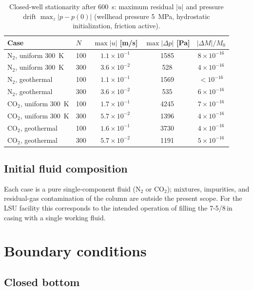 \documentclass[11pt]{article}
\newcommand{\co}{CO$_2$}
\begin{document}
\begin{table}[htb]
\centering
\caption{Closed-well stationarity after \SI{600}{s}: maximum residual
$|u|$ and pressure drift $\max_z|p - p(0)|$ (wellhead pressure
\SI{5}{MPa}, hydrostatic initialization, friction active).}
\label{tab:static}
\begin{tabular}{llccc}
\toprule
Case & $N$ & $\max|u|$ [m/s] & $\max|\Delta p|$ [Pa] &
$|\Delta M|/M_0$\\
\midrule
N$_2$, uniform \SI{300}{K} & 100 & $1.1\times10^{-1}$ & 1585 & $8\times10^{-16}$\\
N$_2$, uniform \SI{300}{K} & 300 & $3.6\times10^{-2}$ & 528 & $4\times10^{-16}$\\
N$_2$, geothermal          & 100 & $1.1\times10^{-1}$ & 1569 & $<10^{-16}$\\
N$_2$, geothermal          & 300 & $3.6\times10^{-2}$ & 535 & $6\times10^{-16}$\\
\co, uniform \SI{300}{K}   & 100 & $1.7\times10^{-1}$ & 4245 & $7\times10^{-16}$\\
\co, uniform \SI{300}{K}   & 300 & $5.7\times10^{-2}$ & 1396 & $4\times10^{-16}$\\
\co, geothermal            & 100 & $1.6\times10^{-1}$ & 3730 & $4\times10^{-16}$\\
\co, geothermal            & 300 & $5.7\times10^{-2}$ & 1191 & $5\times10^{-16}$\\
\bottomrule
\end{tabular}
\end{table}

\subsection{Initial fluid composition}

Each case is a pure single-component fluid (N$_2$ or \co); mixtures,
impurities, and residual-gas contamination of the column are outside
the present scope. For the LSU facility this corresponds to the
intended operation of filling the 7-5/8\,in casing with a single
working fluid.

\section{Boundary conditions}
\label{sec:bc}

\subsection{Closed bottom}
\label{sec:bc-bottom}
\end{document}
